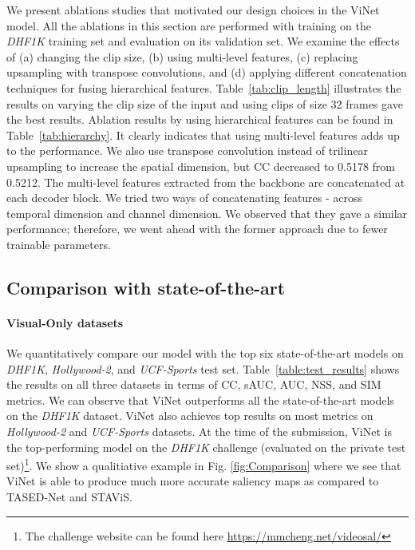 \documentclass[letterpaper, 10 pt, conference]{ieeeconf}  \usepackage{times}
\begin{document}
We present ablations studies that motivated our design choices in the ViNet model. All the ablations in this section are performed with training on the \emph{DHF1K} training set and evaluation on its validation set. We examine the effects of (a) changing the clip size, (b) using multi-level features, (c) replacing upsampling with transpose convolutions, and (d) applying different concatenation techniques for fusing hierarchical features.  Table~\ref{tab:clip_length} illustrates the results on varying the clip size of the input and using clips of size 32 frames gave the best results.  Ablation results by using hierarchical features can be found in Table~\ref{tab:hierarchy}. It clearly indicates that using multi-level features adds up to the performance. We also use transpose convolution instead of trilinear upsampling to increase the spatial dimension, but CC decreased to 0.5178 from 0.5212. The multi-level features extracted from the backbone are concatenated at each decoder block. We tried two ways of concatenating features - across temporal dimension and channel dimension. We observed that they gave a similar performance; therefore, we went ahead with the former approach due to fewer trainable parameters. 









\subsection{Comparison with state-of-the-art}

\paragraph{Visual-Only datasets}
We quantitatively compare our model with the top six state-of-the-art models on \emph{DHF1K}, \emph{Hollywood-2}, and \emph{UCF-Sports} test set. Table~\ref{table:test_results} shows the results on all three datasets in terms of CC, sAUC, AUC, NSS, and SIM metrics. We can observe that ViNet outperforms all the state-of-the-art models on the \emph{DHF1K} dataset. ViNet also achieves top results on most metrics on \emph{Hollywood-2} and \emph{UCF-Sports} datasets. At the time of the submission, ViNet is the top-performing model on the \emph{DHF1K} challenge (evaluated on the private test set)\footnote{The challenge website can be found here \url{https://mmcheng.net/videosal/}}. We show a qualitiative example in Fig. \ref{fig:Comparison} where we see that ViNet is able to produce much more accurate saliency maps as compared to TASED-Net and STAViS.
\end{document}
